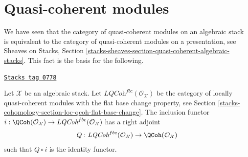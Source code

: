 \section{Quasi-coherent modules}
\label{stacks-cohomology-section-quasi-coherent}
We have seen that the category of quasi-coherent modules on an algebraic
stack is equivalent to the category of quasi-coherent modules on a
presentation, see
Sheaves on Stacks, Section
\ref{stacks-sheaves-section-quasi-coherent-algebraic-stacks}.
This fact is the basis for the following.

\begin{lemma}[Adjoint]
\label{stacks-cohomology-lemma-adjoint}
\href{https://stacks.math.columbia.edu/tag/0778}{\texttt{Stacks tag 0778}}

Let $\mathcal{X}$ be an algebraic stack. Let
$\textit{LQCoh}^{fbc}(\mathcal{O}_\mathcal{X})$
be the category of locally quasi-coherent modules with the
flat base change property, see
Section \ref{stacks-cohomology-section-loc-qcoh-flat-base-change}.
The inclusion functor
$i : \QCoh(\mathcal{O}_\mathcal{X}) \to
\textit{LQCoh}^{fbc}(\mathcal{O}_\mathcal{X})$
has a right adjoint
$$
Q : \textit{LQCoh}^{fbc}(\mathcal{O}_\mathcal{X}) \to
\QCoh(\mathcal{O}_\mathcal{X})
$$
such that $Q \circ i$ is the identity functor.
\end{lemma}

